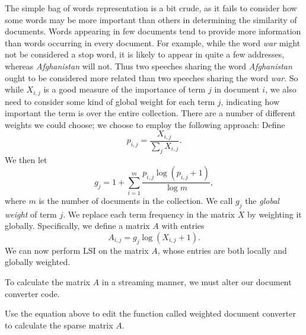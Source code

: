The simple bag of words representation is a bit crude, as it fails to consider how some words may be more important than others
in determining the similarity of documents.
Words appearing in few documents tend
to provide more information than words occurring in every document.
For example, while the word \emph{war} might not be considered a stop word,
it is likely to appear in quite a few addresses, whereas \emph{Afghanistan} will not.
Thus two speeches sharing the word \emph{Afghanistan} ought to be considered more
related than two speeches sharing the word \emph{war}.
So while $X_{i,j}$ is a good measure of the importance of term $j$ in document $i$,
we also need to consider some kind of global weight for each term $j$,
indicating how important the term is over the entire collection.
There are a number of different weights we could choose; we choose to employ
the following approach:
Define
\begin{equation*}
p_{i,j} = \frac{X_{i,j}}{\sum_{j} X_{i,j}}.
\end{equation*}
We then let
\begin{equation*}
g_{j} = 1 + \sum_{i=1}^{m} \frac{p_{i,j} \log (p_{i,j} + 1)}{\log m},
\end{equation*}
where $m$ is the number of documents in the collection.
We call $g_{j}$ the \emph{global weight} of term $j$.
We replace each term frequency in the matrix $X$ by weighting it globally.
Specifically, we define a matrix $A$ with entries
\begin{equation*}
A_{i,j} = g_{j} \log (X_{i,j} + 1).
\end{equation*}
We can now perform LSI on the matrix $A$, whose entries are both locally and globally weighted.

To calculate the matrix $A$ in a streaming manner, we must alter our document converter code.

\begin{problem}
Use the equation above to edit the function called weighted document converter to calculate the sparse matrix $A$. 
\end{problem}

